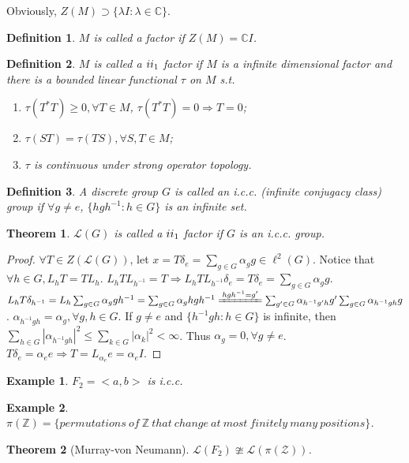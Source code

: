 \documentclass[12pt]{article}
\newtheorem{definition}{Definition}
\newtheorem{example}{Example}
\newtheorem{theorem}{Theorem}
\begin{document}
Obviously, $Z(M)\supset\{\lambda I:\lambda\in\mathbb C \}$.

\begin{definition}
$M$ is called a factor if $Z(M)=\mathbb CI$.
\end{definition}
\begin{definition}
$M$ is called a $\uppercase\expandafter{\romannumeral 2}_1$ factor if $M$ is a infinite dimensional factor and there is a bounded linear functional $\tau$ on $M$ s.t.
\begin{enumerate}
 	\item $\tau(T^*T)\ge 0, \forall T\in M$, $\tau(T^*T)=0\Rightarrow T=0$;
 	\item $\tau(ST)=\tau(TS),\forall S,T\in M$;
 	\item $\tau$ is continuous under strong operator topology.
 \end{enumerate} 
\end{definition}
\begin{definition}
A discrete group $G$ is called an i.c.c. (infinite conjugacy class) group if $\forall g\ne e$, $\{hgh^{-1}:h\in G \}$ is an infinite set.
\end{definition}
\begin{theorem}
$\mathcal L(G)$ is called a $\uppercase\expandafter{\romannumeral 2}_1$ factor if $G$ is an i.c.c. group.
\end{theorem}
\begin{proof}
$\forall T\in Z(\mathcal L(G))$, let $x=T\delta_e=\sum_{g\in G}\alpha_gg\in\ell^2(G)$. Notice that $\forall h\in G, L_hT=TL_h$. $L_hTL_{h^{-1}}=T\Rightarrow L_hTL_{h^{-1}}\delta_e=T\delta_e=\sum_{g\in G}\alpha_gg$. $L_hT\delta_{h^{-1}}=L_h\sum_{g\in G}\alpha_ggh^{-1}=\sum_{g\in G}\alpha_ghgh^{-1}\xlongequal[]{hgh^{-1}=g'}\sum_{g'\in G}\alpha_{h^{-1}g'h}g'\sum_{g\in G}\alpha_{h^{-1}gh}g$. $\alpha_{h^{-1}gh}=\alpha_g,\forall g,h\in G$. If $g\ne e$ and $\{h^{-1}gh:h\in G \}$ is infinite, then $\sum_{h\in G}|\alpha_{h^{-1}gh}|^2\le \sum_{k\in G}|\alpha_k|^2<\infty$. Thus $\alpha_g=0,\forall g\ne e$. $T\delta_e=\alpha_ee\Rightarrow T=L_{\alpha_e}e=\alpha_eI$.
\end{proof}
\begin{example}
$F_2=<a,b>$ is i.c.c. 
\end{example}
\begin{example}
$\pi(\mathbb Z)=\{permutations\ of\ \mathbb{Z}\ that\ change\ at\ most\ finitely\ many\ positions \}$.
\end{example}
\begin{theorem}[Murray-von Neumann]
$\mathcal L(F_2)\ncong\mathcal L(\pi(\mathcal Z))$.
\end{theorem}
\end{document}
